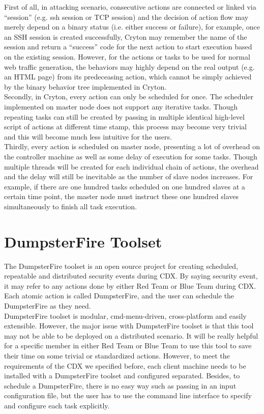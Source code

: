 \documentclass[12pt]{report}
\begin{document}
First of all, in attacking scenario, consecutive actions are connected or linked via “session” (e.g. ssh session or TCP session) and the decision of action flow may merely depend on a binary status (i.e. either success or failure), for example, once an SSH session is created successfully, Cryton may remember the name of the session and return a “success” code for the next action to start execution based on the existing session. However, for the actions or tasks to be used for normal web traffic generation, the behaviors may highly depend on the real output (e.g. an HTML page) from its predeceasing action, which cannot be simply achieved by the binary behavior tree implemented in Cryton.\\

Secondly, in Cryton, every action can only be scheduled for once. The scheduler implemented on master node does not support any iterative tasks. Though repeating tasks can still be created by passing in multiple identical high-level script of actions at different time stamp, this process may become very trivial and this will become much less intuitive for the users.\\

Thirdly, every action is scheduled on master node, presenting a lot of overhead on the controller machine as well as some delay of execution for some tasks. Though multiple threads will be created for each individual chain of actions, the overhead and the delay will still be inevitable as the number of slave nodes increases. For example, if there are one hundred tasks scheduled on one hundred slaves at a certain time point, the master node must instruct these one hundred slaves simultaneously to finish all task execution. 

\section{DumpsterFire Toolset}
The DumpsterFire toolset \citep{Dumpsterfire} is an open source project for creating scheduled, repeatable and distributed security events during CDX. By saying security event, it may refer to any actions done by either Red Team or Blue Team during CDX. Each atomic action is called DumpsterFire, and the user can schedule the DumpsterFire as they need.\\

DumpsterFire toolset is modular, cmd-menu-driven, cross-platform and easily extensible. However, the major issue with DumpsterFire toolset is that this tool may not be able to be deployed on a distributed scenario. It will be really helpful for a specific member in either Red Team or Blue Team to use this tool to save their time on some trivial or standardized actions. However, to meet the requirements of the CDX we specified before, each client machine needs to be installed with a DumpsterFire toolset and configured separated. Besides, to schedule a DumpsterFire, there is no easy way such as passing in an input configuration file, but the user has to use the command line interface to specify and configure each task explicitly.
\end{document}
